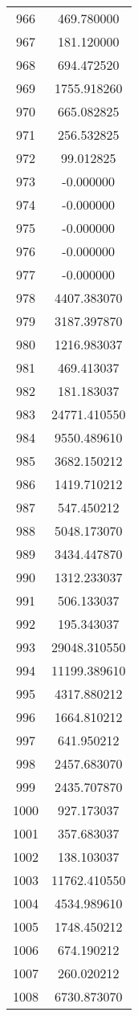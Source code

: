 \documentclass[12pt]{article}
\begin{document}
\begin{longtable}{@{}cc@{}}
966 & 469.780000 \\
967 & 181.120000 \\
968 & 694.472520 \\
969 & 1755.918260 \\
970 & 665.082825 \\
971 & 256.532825 \\
972 & 99.012825 \\
973 & -0.000000 \\
974 & -0.000000 \\
975 & -0.000000 \\
976 & -0.000000 \\
977 & -0.000000 \\
978 & 4407.383070 \\
979 & 3187.397870 \\
980 & 1216.983037 \\
981 & 469.413037 \\
982 & 181.183037 \\
983 & 24771.410550 \\
984 & 9550.489610 \\
985 & 3682.150212 \\
986 & 1419.710212 \\
987 & 547.450212 \\
988 & 5048.173070 \\
989 & 3434.447870 \\
990 & 1312.233037 \\
991 & 506.133037 \\
992 & 195.343037 \\
993 & 29048.310550 \\
994 & 11199.389610 \\
995 & 4317.880212 \\
996 & 1664.810212 \\
997 & 641.950212 \\
998 & 2457.683070 \\
999 & 2435.707870 \\
1000 & 927.173037 \\
1001 & 357.683037 \\
1002 & 138.103037 \\
1003 & 11762.410550 \\
1004 & 4534.989610 \\
1005 & 1748.450212 \\
1006 & 674.190212 \\
1007 & 260.020212 \\
1008 & 6730.873070 \\

\end{longtable}
\end{document}
